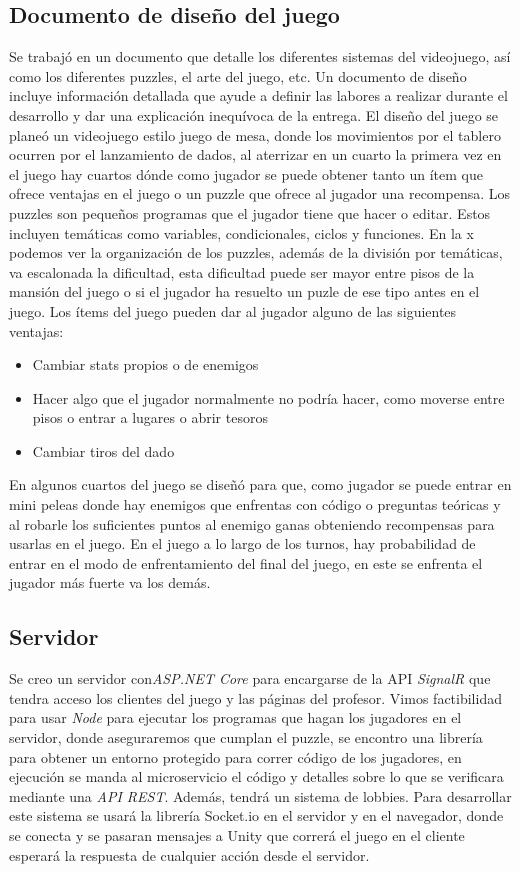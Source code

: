 \subsection{Documento de diseño del juego}
Se trabajó en un documento que detalle los diferentes sistemas del videojuego, así como los diferentes puzzles, el arte del juego, etc. Un documento de diseño incluye información detallada que ayude a definir las labores a realizar durante el desarrollo y dar una explicación inequívoca de la entrega. 
El diseño del juego se planeó un videojuego estilo juego de mesa, donde los movimientos por el tablero ocurren por el lanzamiento de dados, al aterrizar en un cuarto la primera vez en el juego hay cuartos dónde como jugador se puede obtener tanto un ítem que ofrece ventajas en el juego o un puzzle que ofrece al jugador una recompensa. 
Los puzzles son pequeños programas que el jugador tiene que hacer o editar. Estos incluyen temáticas como variables, condicionales, ciclos y funciones. En la x podemos ver la organización de los puzzles, además de la división por temáticas, va escalonada la dificultad, esta dificultad puede ser mayor entre pisos de la mansión del juego o si el jugador ha resuelto un puzle de ese tipo antes en el juego.
Los ítems del juego pueden dar al jugador alguno de las siguientes ventajas:
\begin{itemize}
    \item Cambiar stats propios o de enemigos
    \item Hacer algo que el jugador normalmente no podría hacer, como moverse entre pisos o entrar a lugares o abrir tesoros
    \item Cambiar tiros del dado
\end{itemize}

En algunos cuartos del juego se diseñó para que, como jugador se puede entrar en mini peleas donde hay enemigos que enfrentas con código o preguntas teóricas y al robarle los suficientes puntos al enemigo ganas obteniendo recompensas para usarlas en el juego. 
En el juego a lo largo de los turnos, hay probabilidad de entrar en el modo de enfrentamiento del final del juego, en este se enfrenta el jugador más fuerte va los demás.

\subsection{Servidor}
Se creo un servidor con\textit{ASP.NET Core} para encargarse de la API \textit{SignalR} que tendra acceso los clientes del juego y las páginas del profesor. 
Vimos factibilidad para usar \textit{Node} para ejecutar los programas que hagan los jugadores en el servidor, donde aseguraremos que cumplan el puzzle, se encontro una librería para obtener un entorno protegido para correr código de los jugadores, en ejecución se manda al microservicio el código y detalles sobre lo que se verificara mediante una \textit{API REST}. Además, tendrá un sistema de lobbies.
Para desarrollar este sistema se usará la librería Socket.io en el servidor y en el navegador, donde se conecta y se pasaran mensajes a Unity que correrá el juego en el cliente esperará la respuesta de cualquier acción desde el servidor.


